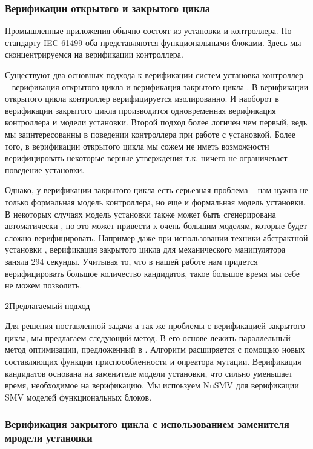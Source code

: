 \documentclass[14pt]{extarticle}
\makeatletter
\theoremstyle{plain}
\theoremstyle{definition}
\renewcommand{\subsection}{\@startsection{subsection}{2}{0mm}%
{2\baselineskip}{\baselineskip}{\bfseries\large\itshape}}
\makeatother
\begin{document}
\subsubsection{Верификации открытого и закрытого цикла}

Промышленные приложения обычно состоят из установки и контроллера. По стандарту
IEC 61499 оба представляются функциональными блоками. Здесь мы сконцентрируемся
на верификации контроллера.

Существуют два основных подхода к верификации систем установка-контроллер --
верификация открытого цикла и верификация закрытого цикла \cite{cl}. В верификации
открытого цикла контроллер верифицируется изолированно. И наоборот в
верификации закрытого цикла производится одновременная верификация контроллера
и модели установки. Второй подход более логичен чем первый, ведь мы
заинтересованны в поведении контроллера при работе с установкой. Более того, в
верификации открытого цикла мы сожем не иметь возможности верифицировать
некоторые верные утверждения т.к. ничего не ограничевает поведение установки.

Однако, у верификации закрытого цикла есть серьезная проблема -- нам нужна не
только формальная модель контроллера, но еще и формальная модель установки.
В некоторых случаях модель установки также может быть сгенерирована
автоматически \cite{dd}, но это может привести к очень большим моделям, которые будет
сложно верифицировать. Например даже при использовании техники абстрактной
установки \cite{dd}, верификация закрытого цикла для механического манипулятора заняла
294 секунды. Учитывая то, что в нашей работе нам придется верифицировать
большое количество кандидатов, такое большое время мы себе не можем позволить.

\subsection{Предлагаемый подход}

Для решения поставленной задачи а так же проблемы с верификацией закрытого
цикла, мы предлагаем следующий метод.  В его основе лежить параллельный
метод оптимизации, предложенный в \cite{rec}. Алгоритм расширяется с помощью новых
составляющих функции приспособленности и опреатора мутации. Верификация
кандидатов основана на заменителе модели установки, что сильно уменьшает время,
необходимое на верификацию. Мы испоьзуем NuSMV \cite{nusmv} для верификации SMV моделей
функциональных блоков.

\subsubsection{Верификация закрытого цикла с использованием заменителя мродели
установки}
\end{document}
